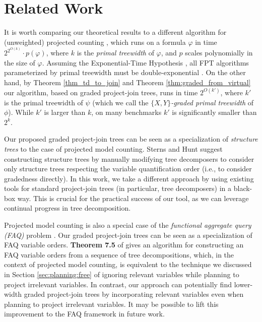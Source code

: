 \section{Related Work}

It is worth comparing our theoretical results to a different algorithm for (unweighted) projected counting \cite{fichte2018exploiting}, which runs on a formula $\varphi$ in time $2^{2^{O(k)}} \cdot p(\varphi)$, where $k$ is the \emph{primal treewidth} \cite{SS10} of $\varphi$, and $p$ scales polynomially in the size of $\varphi$. Assuming the Exponential-Time Hypothesis \cite{impagliazzo2001problems}, all FPT algorithms parameterized by primal treewidth must be double-exponential \cite{fichte2018exploiting}. 
On the other hand, by Theorem \ref{thm_td_to_join} and Theorem \ref{thm:graded_from_virtual} our algorithm, based on graded project-join trees, runs in time $2^{O(k')}$, where $k'$ is the primal treewidth of $\psi$ (which we call the \emph{$\{X,Y\}$-graded primal treewidth} of $\phi$). While $k'$ is larger than $k$, on many benchmarks $k'$ is significantly smaller than $2^k$. 

Our proposed graded project-join trees can be seen as a specialization of \emph{structure trees} \cite{stearns2002exploiting} to the case of projected model counting. Sterns and Hunt \cite{stearns2002exploiting} suggest constructing structure trees by manually modifying tree decomposers to consider only structure trees respecting the variable quantification order (i.e., to consider gradedness directly). In this work, we take a different approach by using existing tools for standard project-join trees (in particular, tree decomposers) in a black-box way. This is crucial for the practical success of our tool, as we can leverage continual progress in tree decomposition. 

Projected model counting is also a special case of the \emph{functional aggregate query (FAQ)} problem \cite{KNR16}. 	Our graded project-join trees can be seen as a specialization of FAQ variable orders. \textbf{Theorem 7.5} of \cite{KNR16} gives an algorithm for constructing an FAQ variable orders from a sequence of tree decompositions, which, in the context of projected model counting, is equivalent to the technique we discussed in Section \ref{sec:planning:free} of ignoring relevant variables while planning to project irrelevant variables. In contrast, our approach can potentially find lower-width graded project-join trees by incorporating relevant variables even when planning to project irrelevant variables. It may be possible to lift this improvement to the FAQ framework in future work.

